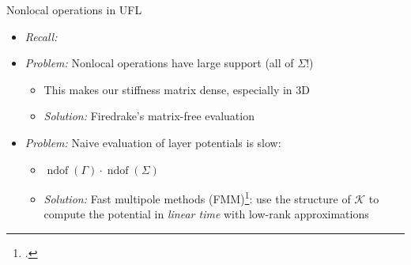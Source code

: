 \documentclass{beamer}
\begin{document}
\begin{frame}{Nonlocal operations in UFL}
    \begin{itemize}
        \item \emph{Recall:} 
        \item<2-> \emph{Problem:} Nonlocal operations have large support (all of
            $\Sigma$!)
        \begin{itemize}
            \item<3-> This makes our stiffness matrix dense, especially
                in 3D
            \item<4-> \emph{Solution:} Firedrake's matrix-free evaluation
        \end{itemize}
        \vfill
        \item<5-> \emph{Problem:} Naive evaluation of layer potentials is slow:
        \begin{itemize}
            \item<7-> $\operatorname{ndof}(\Gamma)\cdot \operatorname{ndof}(\Sigma)$
            \item<8-> \emph{Solution:} Fast multipole methods (FMM)\footcite{Carrier_Greengard_Rokhlin_1988}: use the structure of $\mathcal K$ to compute the potential in \emph{linear time} with low-rank approximations
        \end{itemize}
    \end{itemize}
\end{frame}
\end{document}

